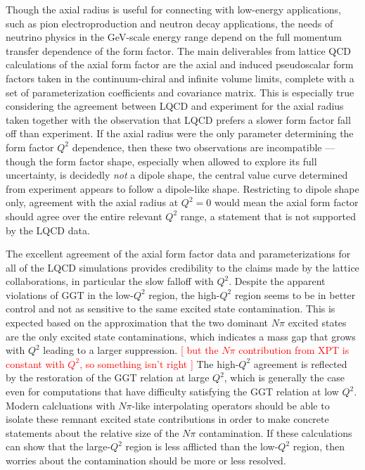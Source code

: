 Though the axial radius is useful for connecting with low-energy applications,
 such as pion electroproduction and neutron decay applications,
 the needs of neutrino physics in the GeV-scale energy range depend
 on the full momentum transfer dependence of the form factor.
The main deliverables from lattice QCD calculations of the axial form factor
 are the axial and induced pseudoscalar form factors taken in the continuum-chiral
 and infinite volume limits, complete with a set of parameterization coefficients
 and covariance matrix.
This is especially true considering the agreement between LQCD and experiment
 for the axial radius taken together with the observation that
 LQCD prefers a slower form factor fall off than experiment.
If the axial radius were the only parameter determining the form factor $Q^2$ dependence,
 then these two observations are incompatible ---
 though the form factor shape, especially when allowed to explore its full uncertainty,
 is decidedly \emph{not} a dipole shape, the central value curve determined
 from experiment appears to follow a dipole-like shape.
Restricting to dipole shape only, agreement with the axial radius at $Q^2=0$
 would mean the axial form factor should agree over the entire relevant $Q^2$ range,
 a statement that is not supported by the LQCD data.

The excellent agreement of the axial form factor data and parameterizations
 for all of the LQCD simulations provides credibility to the claims
 made by the lattice collaborations, in particular the slow falloff with $Q^2$.
Despite the apparent violations of GGT in the low-$Q^2$ region,
 the high-$Q^2$ region seems to be in better control and not as sensitive to
 the same excited state contamination.
This is expected based on the approximation that the
 two dominant $N\pi$ excited states are the only excited state contaminations,
 which indicates a mass gap that grows with $Q^2$ leading to a larger suppression.
\textcolor{red}{[ but the $N\pi$ contribution from XPT is constant with $Q^2$,
 so something isn't right ]}
The high-$Q^2$ agreement is reflected by the restoration of the GGT relation at large $Q^2$,
 which is generally the case even for computations that have difficulty satisfying
 the GGT relation at low $Q^2$.
Modern calcluations with $N\pi$-like interpolating operators should be able
 to isolate these remnant excited state contributions in order to make
 concrete statements about the relative size of the $N\pi$ contamination.
If these calculations can show that the large-$Q^2$ region is less afflicted
 than the low-$Q^2$ region, then worries about the contamination should be more or less resolved.

